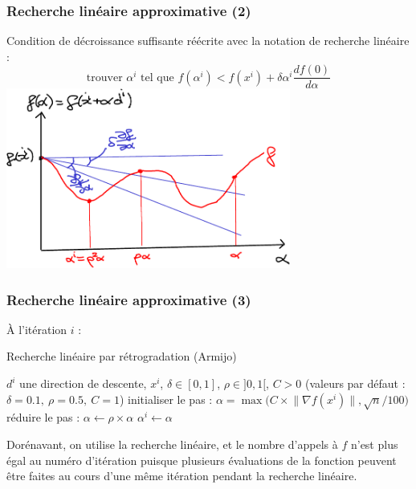 \documentclass[12pt]{beamer}
\begin{document}
\begin{frame}
\frametitle{Recherche linéaire approximative (2)} 
Condition de décroissance suffisante réécrite avec la notation de recherche linéaire :
\begin{equation*}
\text{trouver } \alpha^i \text{ tel que } f(\alpha^i) < f(x^i) + \delta \alpha^i \frac{d f(0)}{d \alpha}
\end{equation*}
\centering
\includegraphics[width=0.7\textwidth]{line_search_backtrack-crop.pdf} 
\end{frame}

\begin{frame}
\frametitle{Recherche linéaire approximative (3)} 
À l’itération $i$ :
\begin{block}{Recherche linéaire par rétrogradation (Armijo)}
\begin{algorithmic}
\REQUIRE $d^i$ une direction de descente, $x^i$, $\delta \in [0,1]$, $\rho \in ]0,1[$, $C>0$
\STATE (valeurs par défaut : $\delta=0.1,~\rho=0.5,~C=1$)
\STATE initialiser le pas : $\alpha = \max\bigl(C \times \lVert \nabla f(x^i) \rVert , \sqrt{n}/100\bigr)$ 
\STATE réduire le pas : $\alpha \leftarrow \rho \times \alpha$
\ENDWHILE 
\RETURN $\alpha^i \leftarrow \alpha$
\end{algorithmic}
\end{block}
Dorénavant, on utilise la recherche linéaire, et le nombre d’appels à $f$ n’est plus égal au numéro d’itération puisque plusieurs évaluations de la fonction peuvent être faites au cours d’une même itération pendant la recherche linéaire.
\end{frame}
\end{document}
